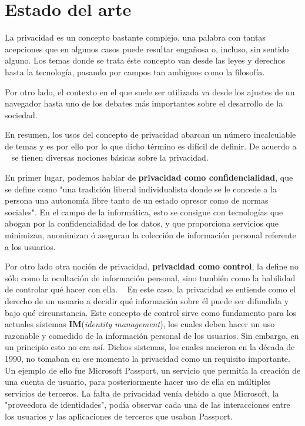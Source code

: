 \chapter{Estado del arte}
\label{chap:estadodelarte}

\label{sec:conceptos}
La privacidad es un concepto bastante complejo, una palabra con tantas acepciones que en algunos casos puede resultar engañosa o, incluso, sin sentido alguno. Los temas donde se trata éste concepto van desde las leyes y derechos hasta la tecnología, pasando por campos tan ambiguos como la filosofía.

Por otro lado, el contexto en el que suele ser utilizada va desde los ajustes de un navegador hasta uno de los debates más importantes sobre el desarrollo de la sociedad.

En resumen, los usos del concepto de privacidad abarcan un número incalculable de temas y es por ello por lo que dicho término es difícil de definir. De acuerdo a ~\cite{article:danezis2010} se tienen diversas nociones básicas sobre la privacidad.

En primer lugar, podemos hablar de \textbf{privacidad como confidencialidad}, que se define como "una tradición liberal individualista donde se le concede a la persona una autonomía libre tanto de un estado opresor como de normas sociales". En el campo de la informática, esto se consigue con tecnologías que abogan por la confidencialidad de los datos, y que proporciona servicios que minimizan, anonimizan ó aseguran la colección de información personal referente a los usuarios.

Por otro lado otra noción de privacidad, \textbf{privacidad como control}, la define no sólo como la ocultación de información personal, sino también como la habilidad de controlar qué hacer con ella. ~\cite{lane2014privacy} En este caso, la privacidad se entiende como el derecho de un usuario a decidir qué información sobre él puede ser difundida y bajo qué circunstancia. Este concepto de control sirve como fundamento para los actuales sistemas \textbf{IM}(\textit{identity management}), los cuales deben hacer un uso razonable y  comedido de la información personal de los usuarios. Sin embargo, en un principio esto no era así. 
Dichos sistemas, los cuales nacieron en la década de 1990, no tomaban en ese momento la privacidad como un requisito importante. Un ejemplo de ello fue Microsoft Passport, un servicio que permitía la creación de una cuenta de usuario, para posteriormente hacer uso de ella en múltiples servicios de terceros. La falta de privacidad venía debido a que Microsoft, la "proveedora de identidades", podía observar cada una de las interacciones entre los usuarios y las aplicaciones de terceros que usaban Passport.

